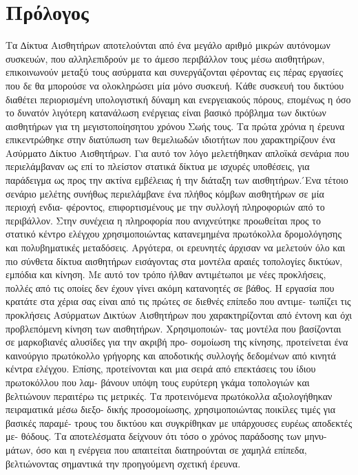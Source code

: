 \tableofcontents
\chapter{Πρόλογος}
Τα ∆ίκτυα Αισθητήρων αποτελούνται από ένα μεγάλο αριθμό μικρών αυτόνομων συσκευών, που αλληλεπιδρούν με το άμεσο περιβάλλον τους μέσω αισθητήρων, επικοινωνούν μεταξύ
τους ασύρματα και συνεργάζονται φέροντας εις πέρας εργασίες που δε θα μπορούσε να ολοκληρώσει μία μόνο συσκευή. Κάθε συσκευή του δικτύου διαθέτει περιορισμένη
υπολογιστική δύναμη και ενεργειακούς πόρους, επομένως η όσο το δυνατόν λιγότερη κατανάλωση ενέργειας είναι βασικό πρόβλημα των δικτύων αισθητήρων για τη
μεγιστοποίησητου χρόνου Σωής τους. Τα πρώτα χρόνια η έρευνα επικεντρώθηκε στην διατύπωση των θεμελιωδών ιδιοτήτων που χαρακτηρίζουν ένα Ασύρματο ∆ίκτυο Αισθητήρων.
Για αυτό τον λόγο μελετήθηκαν απλοϊκά σενάρια που περιελάμβαναν ως επί το πλείστον στατικά δίκτυα με ισχυρές υποθέσεις, για παράδειγμα ως προς την ακτίνα εμβέλειας ή
την διάταξη των αισθητήρων.  ́Ενα τέτοιο σενάριο μελέτης
συνήθως περιελάμβανε ένα πλήθος κόμβων αισθητήρων σε μία περιοχή ενδια-
φέροντος, επιφορτισμένους με την συλλογή πληροφοριών από το περιβάλλον.
Στην συνέχεια η πληροφορία που ανιχνεύτηκε προωθείται προς το στατικό
κέντρο ελέγχου χρησιμοποιώντας κατανεμημένα πρωτόκολλα δρομολόγησης
και πολυβηματικές μεταδόσεις.
Αργότερα, οι ερευνητές άρχισαν να μελετούν όλο και πιο σύνθετα δίκτυα
αισθητήρων εισάγοντας στα μοντέλα αραιές τοπολογίες δικτύων, εμπόδια και
κίνηση. Με αυτό τον τρόπο ήλθαν αντιμέτωποι με νέες προκλήσεις, πολλές
από τις οποίες δεν έχουν γίνει ακόμη κατανοητές σε βάθος. Η εργασία που
κρατάτε στα χέρια σας είναι από τις πρώτες σε διεθνές επίπεδο που αντιμε-
τωπίζει τις προκλήσεις Ασύρματων ∆ικτύων Αισθητήρων που χαρακτηρίζονται
από έντονη και όχι προβλεπόμενη κίνηση των αισθητήρων. Χρησιμοποιών-
τας μοντέλα που βασίζονται σε μαρκοβιανές αλυσίδες για την ακριβή προ-
σομοίωση της κίνησης, προτείνεται ένα καινούργιο πρωτόκολλο γρήγορης
και αποδοτικής συλλογής δεδομένων από κινητά κέντρα ελέγχου. Επίσης,
προτείνονται και μια σειρά από επεκτάσεις του ίδιου πρωτοκόλλου που λαμ-
βάνουν υπόψη τους ευρύτερη γκάμα τοπολογιών και βελτιώνουν περαιτέρω
τις μετρικές.
Τα προτεινόμενα πρωτόκολλα αξιολογήθηκαν πειραματικά μέσω διεξο-
δικής προσομοίωσης, χρησιμοποιώντας ποικίλες τιμές για βασικές παραμέ-
τρους του δικτύου και συγκρίθηκαν με υπάρχουσες ευρέως αποδεκτές με-
θόδους. Τα αποτελέσματα δείχνουν ότι τόσο ο χρόνος παράδοσης των μηνυ-
μάτων, όσο και η ενέργεια που απαιτείται διατηρούνται σε χαμηλά επίπεδα,
βελτιώνοντας σημαντικά την προηγούμενη σχετική έρευνα.
